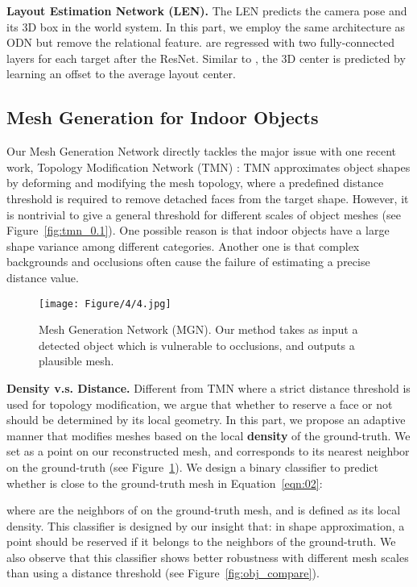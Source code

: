 \documentclass[10pt,twocolumn,letterpaper]{article}
\begin{document}
\noindent\textbf{Layout Estimation Network (LEN).} The LEN predicts the camera pose  and its 3D box  in the world system. In this part, we employ the same architecture as ODN but remove the relational feature.  are regressed with two fully-connected layers for each target after the ResNet. Similar to \cite{huang2018cooperative}, the 3D center  is predicted by learning an offset to the average layout center.

\subsection{Mesh Generation for Indoor Objects}
\label{sec:MGN}
Our Mesh Generation Network directly tackles the major issue with one recent work, Topology Modification Network (TMN) \cite{Junyi}: TMN approximates object shapes by deforming and modifying the mesh topology, where a predefined distance threshold is required to remove detached faces from the target shape. However, it is nontrivial to give a general threshold for different scales of object meshes (see Figure~\ref{fig:tmn_0.1}). One possible reason is that indoor objects have a large shape variance among different categories. Another one is that complex backgrounds and occlusions often cause the failure of estimating a precise distance value.

\begin{figure}[!ht]
	\centering
	\texttt{[image: Figure/4/4.jpg]}
	\caption{Mesh Generation Network (MGN). Our method takes as input a detected object which is vulnerable to occlusions, and outputs a plausible mesh.}
	\label{fig:MGN}
\end{figure}

\noindent\textbf{Density v.s. Distance.} Different from TMN where a strict distance threshold is used for topology modification, we argue that whether to reserve a face or not should be determined by its local geometry. In this part, we propose an adaptive manner that modifies meshes based on the local \textbf{density} of the ground-truth. We set  as a point on our reconstructed mesh, and  corresponds to its nearest neighbor on the ground-truth (see Figure~\ref{fig:MGN}). We design a binary classifier  to predict whether  is close to the ground-truth mesh in Equation~\ref{eqn:02}:

where  are the neighbors of  on the ground-truth mesh, and  is defined as its local density. This classifier is designed by our insight that: in shape approximation, a point should be reserved if it belongs to the neighbors  of the ground-truth. We also observe that this classifier shows better robustness with different mesh scales than using a distance threshold (see Figure~\ref{fig:obj_compare}).
\end{document}
